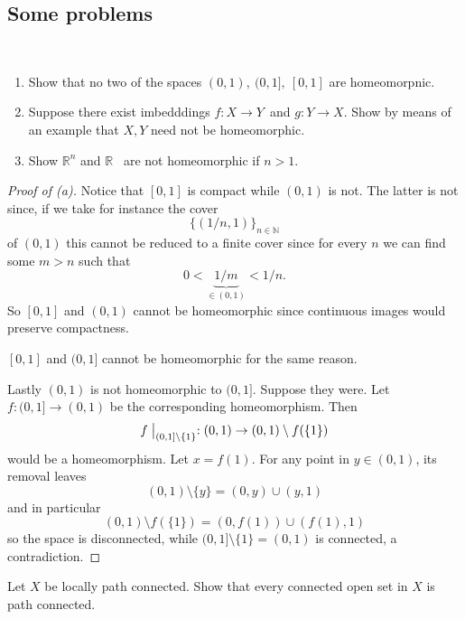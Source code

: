 \documentclass[11pt]{article}
\begin{document}
\subsection{Some problems}
\begin{prob}[Munkres 24.1]
    \medskip
    \ 
    \begin{enumerate}[label=\alph*)]
        \item Show that no two of the spaces $(0,1), \ (0,1], 
            \ [0,1]$ are homeomorpnic. 

        \item Suppose there exist imbedddings $f : X \to Y$ and 
            $g : Y \to X$. Show by means of an 
            example that $X,Y$ need not be homeomorphic. 
        \item Show $\mathbb R^n$ and $\mathbb R$ 
            are not homeomorphic if $n > 1$. 
    \end{enumerate}
\end{prob}
\begin{proof}[Proof of (a)]
    Notice that $[0,1]$ is compact 
    while $(0,1)$ is not. 
    The latter is not since, if 
    we take for instance the cover 
    \[
        \{(1/n, 1)\}_{n\in \mathbb N}
    \]
    of $(0,1)$ this cannot be reduced to a 
    finite cover since for every $n$ we 
    can find some $m > n$ such that 
    \[
        0 < \underbrace{1/m}_{\in (0,1)} < 1/n.  
    \]
    So $[0,1]$ and $(0,1)$ cannot be homeomorphic since 
    continuous images would preserve compactness. 

    $[0,1]$ and $(0,1]$ cannot be homeomorphic for the same 
    reason. 

    Lastly $(0,1)$ is not homeomorphic to $(0,1]$. 
    Suppose they were. Let $f : (0,1] \to (0,1)$ be 
    the corresponding homeomorphism. 
    Then 
    \[
        f\bigm|_{(0,1] \setminus \{1\}} : 
        (0,1) \to (0,1) \setminus f(\{1\})  
    \]
    would be a homeomorphism. Let $x = f(1)$.  
    For any point in $y \in (0,1)$, its removal leaves  
    \[
        (0,1) \setminus \{y\} = (0,y) \cup (y,1)
    \]
    and in particular 
    \[
        (0,1) \setminus f(\{1\}) = (0,f(1)) \cup (f(1), 1)
    \]
    so the space is disconnected, while 
    $(0,1] \setminus \{1\} = (0,1)$ is connected, a 
    contradiction. 
\end{proof}

\begin{prob}[Munkres 25.4]
    Let $X$ be locally path connected. 
    Show that every connected open set in $X$ 
    is path connected.
\end{prob}
\end{document}
